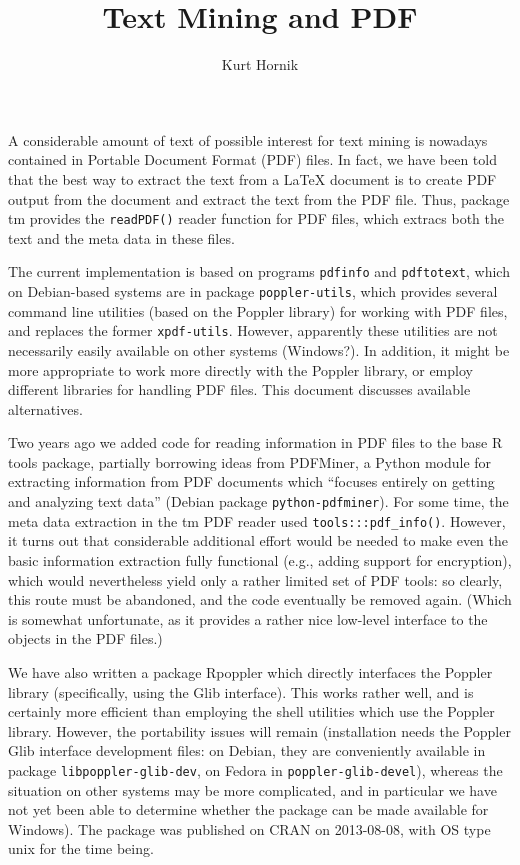 \documentclass[a4paper]{article}
\title{Text Mining and PDF}
\author{Kurt Hornik}
\newcommand{\strong}[1]{{\normalfont\fontseries{b}\selectfont #1}}
\let\pkg=\strong
\begin{document}
\maketitle{}

A considerable amount of text of possible interest for text mining is
nowadays contained in Portable Document Format (PDF) files.  In fact, we
have been told that the best way to extract the text from a \LaTeX{}
document is to create PDF output from the document and extract the text
from the PDF file.  Thus, package \pkg{tm} provides the \verb|readPDF()|
reader function for PDF files, which extracs both the text and the meta
data in these files.

The current implementation is based on programs \verb|pdfinfo| and
\verb|pdftotext|, which on Debian-based systems are in package
\verb|poppler-utils|, which provides several command line utilities
(based on the Poppler library) for working with PDF files, and replaces
the former \verb|xpdf-utils|.  However, apparently these utilities are
not necessarily easily available on other systems (Windows?).  In
addition, it might be more appropriate to work more directly with the
Poppler library, or employ different libraries for handling PDF files.
This document discusses available alternatives.

Two years ago we added code for reading information in PDF files to the
base R \pkg{tools} package, partially borrowing ideas from PDFMiner, a
Python module for extracting information from PDF documents which
``focuses entirely on getting and analyzing text data'' (Debian package
\verb|python-pdfminer|).  For some time, the meta data extraction in the
\pkg{tm} PDF reader used \verb|tools:::pdf_info()|.  However, it turns
out that considerable additional effort would be needed to make even the
basic information extraction fully functional (e.g., adding support for
encryption), which would nevertheless yield only a rather limited set of
PDF tools: so clearly, this route must be abandoned, and the code
eventually be removed again.  (Which is somewhat unfortunate, as it
provides a rather nice low-level interface to the objects in the PDF
files.)

We have also written a package \pkg{Rpoppler} which directly interfaces
the Poppler library (specifically, using the Glib interface).  This
works rather well, and is certainly more efficient than employing the
shell utilities which use the Poppler library.  However, the portability
issues will remain (installation needs the Poppler Glib interface
development files: on Debian, they are conveniently available in package
\verb|libpoppler-glib-dev|, on Fedora in \verb|poppler-glib-devel|),
whereas the situation on other systems may be more complicated, and in
particular we have not yet been able to determine whether the package
can be made available for Windows).  The package was published on CRAN
on 2013-08-08, with OS type unix for the time being.
\end{document}
